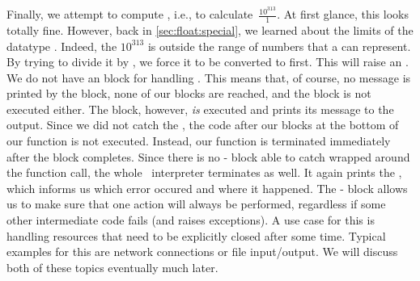 Finally, we attempt to compute , i.e., to calculate~$\frac{10^{313}}{1}$.
At first glance, this looks totally fine.
However, back in \cref{sec:float:special}, we learned about the limits of the datatype .
Indeed, the  $10^{313}$ is outside the range of numbers that a  can represent.
By trying to divide it by , we force it to be converted to  first.
This will raise an .
We do not have an  block for handling .
This means that, of course, no message is printed by the  block, none of our  blocks are reached, and the  block is not executed either.
The  block, however, \emph{is} executed and prints its message to the output.
Since we did not catch the , the code after our blocks at the bottom of our function is not executed.
Instead, our function is terminated immediately after the  block completes.
Since there is no - block able to catch  wrapped around the function call, the whole \python\ interpreter terminates as well.
It again prints the , which informs us which error occured and where it happened.%
%
\FloatBarrier%
\endhsection%
%
%
%
\label{sec:withAndContextManagers}%
%
%
%
%
%
The - block allows us to make sure that one action will always be performed, regardless if some other intermediate code fails (and raises exceptions).
A use case for this is handling resources that need to be explicitly closed after some time.
Typical examples for this are network connections or file input/output.
We will discuss both of these topics eventually much later.


